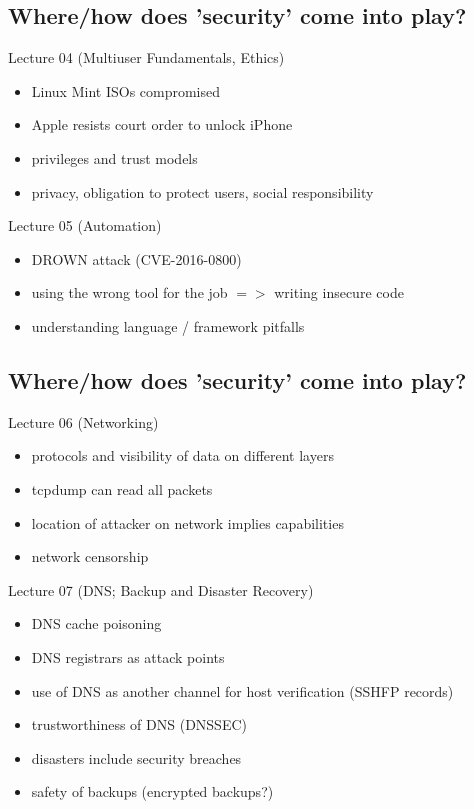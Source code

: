 \documentclass[xga]{xdvislides}
\begin{document}
\subsection{Where/how does 'security' come into play?}
Lecture 04 (Multiuser Fundamentals, Ethics)
\begin{itemize}
	\item Linux Mint ISOs compromised
	\item Apple resists court order to unlock iPhone
	\item privileges and trust models
	\item privacy, obligation to protect users, social responsibility
\end{itemize}
\vspace{.5in}
Lecture 05 (Automation)
\begin{itemize}
	\item DROWN attack (CVE-2016-0800)
	\item using the wrong tool for the job $=>$ writing insecure code
	\item understanding language / framework pitfalls
\end{itemize}

\subsection{Where/how does 'security' come into play?}
Lecture 06 (Networking)
\begin{itemize}
	\item protocols and visibility of data on different layers
	\item tcpdump can read all packets
	\item location of attacker on network implies capabilities
	\item network censorship
\end{itemize}
\vspace{.5in}
Lecture 07 (DNS; Backup and Disaster Recovery)
\begin{itemize}
	\item DNS cache poisoning
	\item DNS registrars as attack points
	\item use of DNS as another channel for host verification (SSHFP records)
	\item trustworthiness of DNS (DNSSEC)
	\item disasters include security breaches
	\item safety of backups (encrypted backups?)
\end{itemize}
\end{document}
